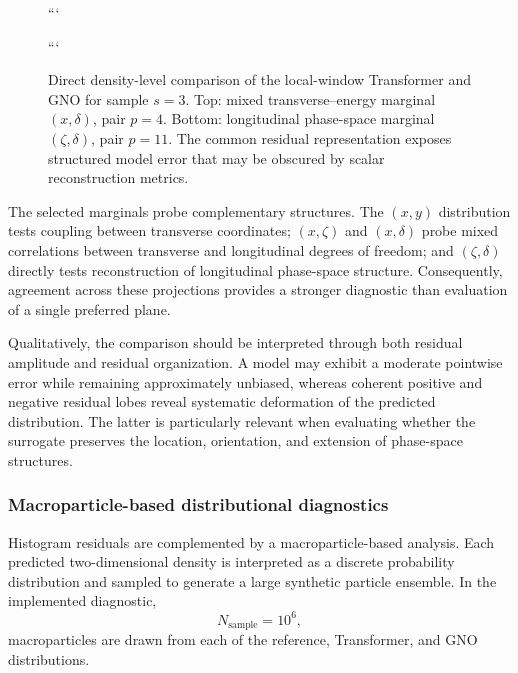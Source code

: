 \begin{figure}[p]
\centering
{}

```
\vspace{0.8em}


\caption{
Direct density-level comparison of the local-window Transformer and GNO for sample \(s=3\). Top: mixed transverse--energy marginal \((x,\delta)\), pair \(p=4\). Bottom: longitudinal phase-space marginal \((\zeta,\delta)\), pair \(p=11\). The common residual representation exposes structured model error that may be obscured by scalar reconstruction metrics.
}
\label{fig:tf_gno_comparison_xdelta_longitudinal}
```

\end{figure}

The selected marginals probe complementary structures. The \((x,y)\) distribution tests coupling between transverse coordinates; \((x,\zeta)\) and \((x,\delta)\) probe mixed correlations between transverse and longitudinal degrees of freedom; and \((\zeta,\delta)\) directly tests reconstruction of longitudinal phase-space structure. Consequently, agreement across these projections provides a stronger diagnostic than evaluation of a single preferred plane.

Qualitatively, the comparison should be interpreted through both residual amplitude and residual organization. A model may exhibit a moderate pointwise error while remaining approximately unbiased, whereas coherent positive and negative residual lobes reveal systematic deformation of the predicted distribution. The latter is particularly relevant when evaluating whether the surrogate preserves the location, orientation, and extension of phase-space structures.

\subsubsection{Macroparticle-based distributional diagnostics}
\label{subsubsec:results_macroparticle_comparison}

Histogram residuals are complemented by a macroparticle-based analysis. Each predicted two-dimensional density is interpreted as a discrete probability distribution and sampled to generate a large synthetic particle ensemble. In the implemented diagnostic,
\begin{equation}
N_{\mathrm{sample}}
=
10^{6},
\end{equation}
macroparticles are drawn from each of the reference, Transformer, and GNO distributions.

